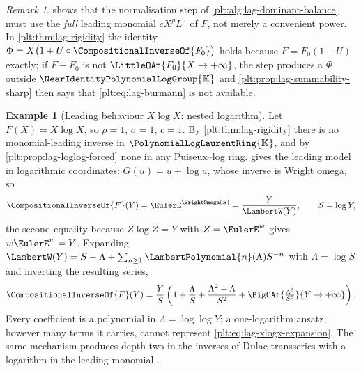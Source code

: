 \documentclass[11pt,oneside]{article}
\theoremstyle{plain}
\theoremstyle{definition}
\newtheorem{example}[theorem]{Example}
\theoremstyle{remark}
\newtheorem{remark}[theorem]{Remark}
\newcommand{\K}{\mathbb{K}}
\newcommand{\PLlau}{\PolynomialLogLaurentRing{\K}}       %
\newcommand{\Gnear}{\NearIdentityPolynomialLogGroup{\K}} %
\newcommand{\compose}{\mathbin{\circ}}
\newcommand{\rev}[1]{\CompositionalInverseOf{#1}}
\newcommand{\LamP}[1]{\LambertPolynomial{#1}}
\begin{document}
\begin{remark}
\label{plt:rmk:lag-normalisation-care}
 shows that the normalisation step of
\cref{plt:alg:lag-dominant-balance} must use the \emph{full} leading monomial
\(cX^\rho L^\sigma\) of \(F\), not merely a convenient power.  In
\cref{plt:thm:lag-rigidity} the identity
\(\Phi=X\bigl(1+U\compose\rev{F_0}\bigr)\) holds because \(F=F_0(1+U)\)
exactly; if \(F-F_0\) is not \(\LittleOAt{F_0}{X\to+\infty}\), the step
produces a \(\Phi\) outside \(\Gnear\) and
\cref{plt:prop:lag-summability-sharp} then says that
\cref{plt:eq:lag-burmann} is not available.
\end{remark}

\begin{example}[Leading behaviour \(X\log X\): nested logarithm]
\label{plt:ex:lag-xlogx}
Let \(F(X)=X\log X\), so \(\rho=1\), \(\sigma=1\), \(c=1\).  By
\cref{plt:thm:lag-rigidity} there is no monomial-leading inverse in
\(\PLlau\), and by \cref{plt:prop:lag-loglog-forced} none in any Puiseux--log
ring.   gives the leading model in
logarithmic coordinates: \(G(u)=u+\log u\), whose inverse is Wright omega, so
\begin{equation}
\label{plt:eq:lag-xlogx-inverse}
  \rev{F}(Y)=\EulerE^{\WrightOmega(S)}=\frac{Y}{\LambertW(Y)},
  \qquad S=\log Y,
\end{equation}
the second equality because \(Z\log Z=Y\) with \(Z=\EulerE^{w}\) gives
\(w\EulerE^{w}=Y\).  Expanding \(\LambertW(Y)=S-\Lambda+\sum_{n\ge1}\LamP{n}(\Lambda)S^{-n}\)
with \(\Lambda=\log S\) and inverting the resulting series,
\begin{equation}
\label{plt:eq:lag-xlogx-expansion}
  \rev{F}(Y)=\frac{Y}{S}\left(1+\frac{\Lambda}{S}
   +\frac{\Lambda^2-\Lambda}{S^2}
   +\BigOAt{\tfrac{\Lambda^3}{S^3}}{Y\to+\infty}\right).
\end{equation}
Every coefficient is a polynomial in \(\Lambda=\log\log Y\); a one-logarithm
ansatz, however many terms it carries, cannot represent
\cref{plt:eq:lag-xlogx-expansion}.  The same mechanism produces depth two in
the inverses of Dulac transseries with a logarithm in the leading monomial
\cite{mardesic-length,resman-dulac}.
\end{example}
\end{document}
